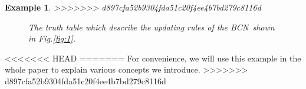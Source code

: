 \documentclass[conference]{IEEEtran} %
\newtheorem{example}{Example}
\def \BCN {{\em BCN}}
\begin{document}
\begin{example}
>>>>>>> d897cfa52b9304fda51c20f4ee4b7bd279c8116d
  \begin{figure}[thpb]
      \centering
      
      \caption{The truth table which describe the updating rules of the \BCN\ shown in {\em Fig.\ref{fig:1}}.}
      \label{fig:2}
   \end{figure}
\end{example}   
<<<<<<< HEAD
=======
For convenience, we will use this example in the whole paper to explain various concepts we introduce.
>>>>>>> d897cfa52b9304fda51c20f4ee4b7bd279c8116d


\end{document}
